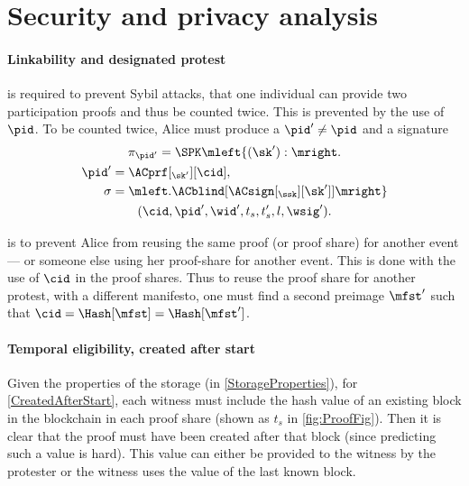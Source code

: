 \section{Security and privacy analysis}%
\label{SecurityAnalysis}

\paragraph{Linkability and designated protest}

 is required to prevent Sybil attacks, \ie that one individual 
can provide two participation proofs and thus be counted twice.
This is prevented by the use of \(\pid\).
To be counted twice, Alice must produce a \(\pid'\neq \pid\) and a signature
\begin{multline*}
\pi_{\pid'} = \SPK\mleft\{ (\sk') : \mright. \\
  \begin{aligned}
    \pid' &= \ACprf[_{\sk'}][\cid], \\
    \sigma &= \mleft. \ACblind[\ACsign[_{\ssk}][\sk']] \mright\}
  \end{aligned} \\
    (\cid, \pid', \wid', t_s, t_s', l, \wsig').
\end{multline*}

 is to prevent Alice from reusing the same proof (or proof 
share) for another event --- or someone else using her proof-share for another 
event.
This is done with the use of \(\cid\) in the proof shares.
Thus to reuse the proof share for another protest, with a different manifesto, 
one must find a second preimage \(\mfst'\) such that \(\cid = \Hash[\mfst] = 
  \Hash[\mfst']\).

\paragraph{Temporal eligibility, created after start}

Given the properties of the storage (in \cref{StorageProperties}), for 
\cref{CreatedAfterStart}, each witness must include the hash value of an 
existing block in the blockchain in each proof share (shown as \(t_s\) in 
\cref{fig:ProofFig}).
Then it is clear that the proof must have been created after that block (since 
predicting such a value is hard).
This value can either be provided to the witness by the protester or the witness 
uses the value of the last known block.

